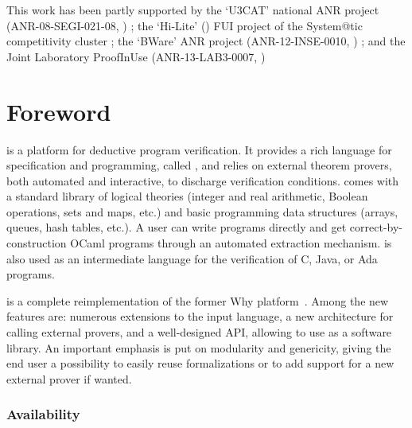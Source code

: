 \documentclass[a4paper,11pt,twoside,openright]{memoir}
\newcommand{\ahref}[2]{{#2}}
\newenvironment{latexonly}{}{}
\begin{document}
\begin{center}
\begin{flushleft}
This work has been partly supported by the `\ahref{\urlutcat}{U3CAT}'
national ANR project (ANR-08-SEGI-021-08\begin{latexonly},
  \urlutcat\end{latexonly}) ; the `\ahref{\urlhilite}{Hi-Lite}'
\begin{latexonly}(\urlhilite)\end{latexonly} FUI project of the
System@tic competitivity cluster ; the `\ahref{\urlbware}{BWare}'
ANR project (ANR-12-INSE-0010\begin{latexonly},
  \urlbware\end{latexonly}) ; and the \ahref{\urlproofinuse}{Joint Laboratory ProofInUse} (ANR-13-LAB3-0007\begin{latexonly}, \urlproofinuse\end{latexonly})
\end{flushleft}
\end{center}

\chapter*{Foreword}

\why is a platform for deductive program verification. It provides
a rich language for specification and programming, called \whyml, and
relies on external theorem provers, both automated and interactive,
to discharge verification conditions. \why comes with a standard
library of logical theories (integer and real arithmetic, Boolean
operations, sets and maps, etc.) and basic programming data structures
(arrays, queues, hash tables, etc.). A user can write \whyml programs
directly and get correct-by-construction OCaml programs through an
automated extraction mechanism. \whyml is also used as an intermediate
language for the verification of C, Java, or Ada programs.

\why is a complete reimplementation %
of the former Why platform~\cite{filliatre07cav}.
Among the new features are: numerous
extensions to the input language, a new architecture for calling
external provers, and a well-designed API, allowing to use \why as a
software library.  An important emphasis is put on modularity and
genericity, giving the end user a possibility to easily reuse \why
formalizations or to add support for a new external prover if wanted.

\subsection*{Availability}
\end{document}
